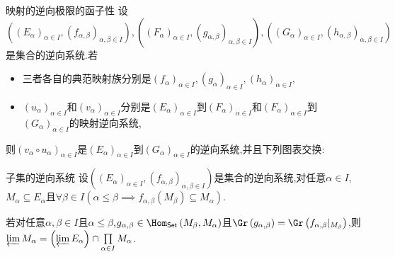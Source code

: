 \begin{corollary}{映射的逆向极限的函子性}{}
	设$\left(\left(E_{\alpha}\right)_{\alpha\in I},\left(f_{\alpha,\beta}\right)_{\alpha,\beta\in I}\right),\left(\left(F_{\alpha}\right)_{\alpha\in I},\left(g_{\alpha,\beta}\right)_{\alpha,\beta\in I}\right),\left(\left(G_{\alpha}\right)_{\alpha\in I},\left(h_{\alpha,\beta}\right)_{\alpha,\beta\in I}\right)$是集合的逆向系统.若
	\begin{itemize}
		\item 三者各自的典范映射族分别是$\left(f_{\alpha}\right)_{\alpha\in I},\left(g_{\alpha}\right)_{\alpha\in I},\left(h_{\alpha}\right)_{\alpha\in I}$,
		\item $\left(u_{\alpha}\right)_{\alpha\in I}$和$\left(v_{\alpha}\right)_{\alpha\in I}$分别是$\left(E_{\alpha}\right)_{\alpha\in I}$到$\left(F_{\alpha}\right)_{\alpha\in I}$和$\left(F_{\alpha}\right)_{\alpha\in I}$到$\left(G_{\alpha}\right)_{\alpha\in I}$的映射逆向系统,
	\end{itemize}
	则$\left(v_{\alpha}\circ u_{\alpha}\right)_{\alpha\in I}$是$\left(E_{\alpha}\right)_{\alpha\in I}$到$\left(G_{\alpha}\right)_{\alpha\in I}$的逆向系统,并且下列图表交换:
	\begin{center}
	\end{center}
\end{corollary}

\begin{proposition}{子集的逆向系统}{}
	设$\left(\left(E_{\alpha}\right)_{\alpha\in I},\left(f_{\alpha,\beta}\right)_{\alpha,\beta\in I}\right)$是集合的逆向系统,对任意$\alpha\in I$,$M_{\alpha}\subseteq E_{\alpha}$且$\forall\beta\in I\left(\alpha\leq\beta\implies f_{\alpha,\beta}\left(M_{\beta}\right)\subseteq M_{\alpha}\right)$.
	
	若对任意$\alpha,\beta\in I$且$\alpha\leq\beta$,$g_{\alpha,\beta}\in\Hom_{\mathsf{Set}}\left(M_{\beta},M_{\alpha}\right)$且$\Gr\left(g_{\alpha,\beta}\right)=\Gr\left(f_{\alpha,\beta}|_{M_{\beta}}\right)$,则$\varprojlim M_{\alpha}=\left(\varprojlim E_{\alpha}\right)\cap\prod\limits_{\alpha\in I}M_{\alpha}$.
\end{proposition}

